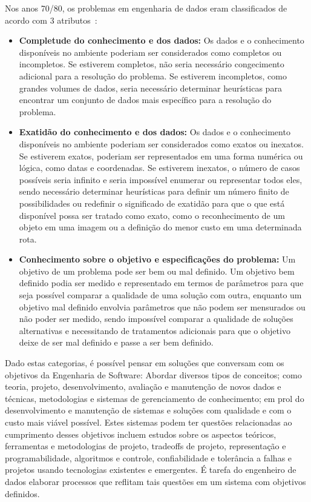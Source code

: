 \documentclass[portugues]{ic-tese}
\begin{document}
Nos anos 70/80, os problemas em engenharia de dados eram classificados de acordo com 3 atributos~\citep{IEEE_1989}:

\begin{itemize}
\item \textbf{Completude do conhecimento e dos dados:} Os dados e o conhecimento disponíveis no ambiente poderiam ser considerados como completos ou incompletos. Se estiverem completos, não seria necessário congecimento adicional para a resolução do problema. Se estiverem incompletos, como grandes volumes de dados, seria necessário determinar heurísticas para encontrar um conjunto de dados mais específico para a resolução do problema.
\item \textbf{Exatidão do conhecimento e dos dados:} Os dados e o conhecimento disponíveis no ambiente poderiam ser considerados como exatos ou inexatos. Se estiverem exatos, poderiam ser representados em uma forma numérica ou lógica, como datas e coordenadas. Se estiverem inexatos, o número de casos possíveis seria infinito e seria impossível enumerar ou representar todos eles, sendo necessário determinar heurísticas para definir um número finito de possibilidades ou redefinir o significado de exatidão para que o que está disponível possa ser tratado como exato, como o reconhecimento de um objeto em uma imagem ou a definição do menor custo em uma determinada rota.
\item \textbf{Conhecimento sobre o objetivo e especificações do problema:} Um objetivo de um problema pode ser bem ou mal definido. Um objetivo bem definido podia ser medido e representado em termos de parâmetros para que seja possível comparar a qualidade de uma solução com outra, enquanto um objetivo mal definido envolvia parâmetros que não podem ser mensurados ou não poder ser medido, sendo impossível comparar a qualidade de soluções alternativas e necessitando de tratamentos adicionais para que o objetivo deixe de ser mal definido e passe a ser bem definido. 
\end{itemize}

Dado estas categorias, é possível pensar em soluções que conversam com os objetivos da Engenharia de Software: Abordar diversos tipos de conceitos; como teoria, projeto, desenvolvimento, avaliação e manutenção de novos dados e técnicas, metodologias e sistemas de gerenciamento de conhecimento; em prol do desenvolvimento e manutenção de sistemas e soluções com qualidade e com o custo mais viável possível. Estes sistemas podem ter questões relacionadas ao cumprimento desses objetivos incluem estudos sobre os aspectos teóricos, ferramentas e metodologias de projeto, tradeoffs de projeto, representação e programabilidade, algoritmos e controle, confiabilidade e tolerância a falhas e projetos usando tecnologias existentes e emergentes. É tarefa do engenheiro de dados elaborar processos que reflitam tais questões em um sistema com objetivos definidos.
\end{document}
